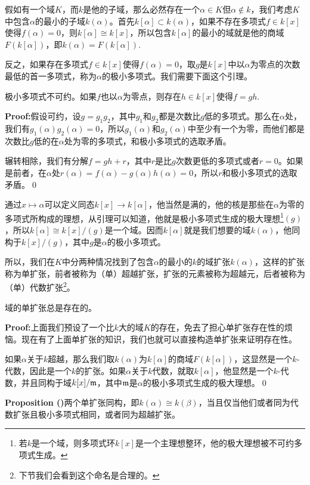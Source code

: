\documentclass[9pt]{extbook}
\newcommand{\paracount}[1]{\refstepcounter{para}\textbf{#1 (\thepara)}}
\newcommand{\pro}{\paracount{Proposition}}
\renewcommand{\proof}{\textbf{Proof:}\hspace{0.5em}}
\begin{document}
假如有一个域$K$，而$k$是他的子域，那么必然存在一个$\alpha\in K$但$\alpha\notin k$，我们考虑$K$中包含$\alpha$的最小的子域$k(\alpha)$。首先$k[\alpha]\subset k(\alpha)$，如果不存在多项式$f\in k[x]$使得$f(\alpha)=0$，则$k[\alpha]\cong k[x]$，所以包含$k[\alpha]$的最小的域就是他的商域$F(k[\alpha])$，即$k(\alpha)=F(k[\alpha])$.

反之，如果存在多项式$f\in k[x]$使得$f(\alpha)=0$，取$g$是$k[x]$中以$\alpha$为零点的次数最低的首一多项式，称为$\alpha$的极小多项式。我们需要下面这个引理。
\begin{lem}
	极小多项式不可约。如果$f$也以$\alpha$为零点，则存在$h\in k[x]$使得$f=gh$.
\end{lem}

\proof 假设可约，设$g=g_1g_2$，其中$g_1$和$g_2$都是次数比$g$低的多项式。那么在$\alpha$处，我们有$g_1(\alpha)g_2(\alpha)=0$，所以$g_1(\alpha)$和$g_2(\alpha)$中至少有一个为零，而他们都是次数比$g$低的在$\alpha$处为零的多项式，和极小多项式的选取矛盾。

	辗转相除，我们有分解$f=gh+r$，其中$r$是比$g$次数更低的多项式或者$r=0$。如果是前者，在$\alpha$处$r(\alpha)=f(\alpha)-g(\alpha)h(\alpha)=0$，所以$r$和极小多项式的选取矛盾。\qed

通过$x\mapsto \alpha$可以定义同态$k[x]\to k[\alpha]$，他当然是满的，他的核是那些在$\alpha$为零的多项式所构成的理想，从引理可以知道，他就是极小多项式生成的极大理想\footnote{若$k$是一个域，则多项式环$k[x]$是一个主理想整环，他的极大理想被不可约多项式生成。}$(g)$，所以$k[\alpha]\cong k[x]/(g)$是一个域。因而$k[\alpha]$就是我们想要的域$k(\alpha)$，他同构于$k[x]/(g)$，其中$g$是$\alpha$的极小多项式。

所以，我们在$K$中分两种情况找到了包含$\alpha$的最小的$k$的域扩张$k(\alpha)$，这样的扩张称为单扩张，前者被称为（单）超越扩张，扩张的元素被称为超越元，后者被称为（单）代数扩张\footnote{下节我们会看到这个命名是合理的。}。

\begin{theo}
	域的单扩张总是存在的。
\end{theo}

\proof 上面我们预设了一个比$k$大的域$K$的存在，免去了担心单扩张存在性的烦恼。现在有了上面单扩张的知识，我们也就可以直接构造单扩张来证明存在性。

	如果$\alpha$关于$k$超越，那么我们取$k(\alpha)$为$k[\alpha]$的商域$F(k[\alpha])$，这显然是一个$k$-代数，因此是一个$k$的扩张。如果$\alpha$关于$k$代数，就取$k[\alpha]$，他显然是一个$k$-代数，并且同构于域$k[x]/\mathfrak{m}$，其中$\mathfrak{m}$是$\alpha$的极小多项式生成的极大理想。\qed

\pro 	两个单扩张同构，即$k(\alpha)\cong k(\beta)$，当且仅当他们或者同为代数扩张且极小多项式相同，或者同为超越扩张。
\end{document}
